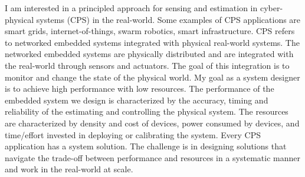\documentclass[10pt]{article}
\date{}
\begin{document}


\title{{\Large  }}
\vspace{-1em}
\maketitle

\vspace{-12em}



I am interested in a principled approach for sensing and estimation in cyber-physical systems (CPS) in the real-world. Some examples of CPS applications are smart grids, internet-of-things, swarm robotics, smart infrastructure.
CPS refers to networked embedded systems integrated with physical real-world systems. The networked embedded systems are physically distributed and are integrated with the real-world through sensors and actuators. The goal of this integration is to monitor and change the state of the physical world. My goal as a system designer is to achieve high performance with low resources. %
The performance of the embedded system we design is characterized by the accuracy, timing and reliability of the estimating and controlling the physical system. The resources are characterized by density and cost of devices, power consumed by devices, and time/effort invested in deploying or calibrating the system. Every CPS application has a system solution. The challenge is in designing solutions that navigate the trade-off between performance and resources in a systematic manner and work in the real-world at scale.
\end{document}
